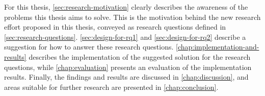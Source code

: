 \noindent
For this thesis, \cref{sec:research-motivation} clearly describes the awareness of the problems this thesis aims to solve. This is the motivation behind the new research effort proposed in this thesis, conveyed as research questions defined in \cref{sec:research-questions}. \cref{sec:design-for-rq1} and \cref{sec:design-for-rq2} describe a suggestion for how to answer these research questions. \cref{chap:implementation-and-results} describes the implementation of the suggested solution for the research questions, while \cref{chap:evaluation} presents an evaluation of the implementation results. Finally, the findings and results are discussed in \cref{chap:discussion}, and areas suitable for further research are presented in \cref{chap:conclusion}.
%
%
%








